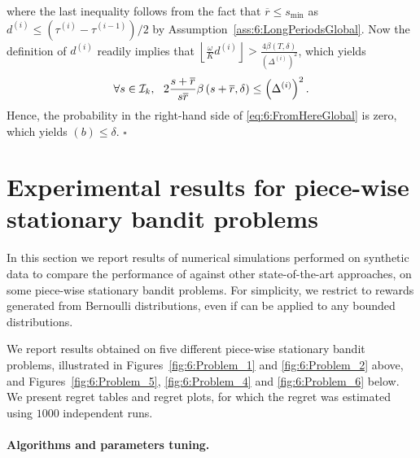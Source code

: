 %
where the last inequality follows from the fact that $\overline{r} \leq s_{\min}$ as $d^{(i)} \leq (\tau^{(i)} - \tau^{(i-1)})/2$ by Assumption~\ref{ass:6:LongPeriodsGlobal}. Now the definition of $d^{(i)}$ readily implies that
$\left\lfloor \frac{\omega}{K}d^{(i)}\right\rfloor > \frac{4\beta(T,\delta)}{\left(\Delta^{(i)}\right)^2}$,
which yields
\[\forall s \in \cI_k, \ \ 2\frac{s+\overline{r}}{s\overline{r}}\beta\left(s+\overline{r}, \delta\right) \leq \left(\Delta^{(i)}\right)^2.\]
%
Hence, the probability in the right-hand side of \eqref{eq:6:FromHereGlobal} is zero, which yields $(b) \leq \delta$.
%
\hfill{}$\square$





\section{Experimental results for piece-wise stationary bandit problems}
\label{sec:6:NumericalExperiments}

In this section we report results of numerical simulations performed on synthetic data to compare the performance of \GLRklUCB{} against other state-of-the-art approaches, on some piece-wise stationary bandit problems.
%
For simplicity, we restrict to rewards generated from Bernoulli distributions, even if \GLRklUCB{} can be applied to any bounded distributions.


We report results obtained on five different piece-wise stationary bandit problems, illustrated in Figures~\ref{fig:6:Problem_1} and \ref{fig:6:Problem_2} above, and Figures~\ref{fig:6:Problem_5}, \ref{fig:6:Problem_4} and \ref{fig:6:Problem_6} below.
We present regret tables and regret plots,
for which the regret was estimated using $1000$ independent runs.


\paragraph{Algorithms and parameters tuning.}
\label{sub:6:ParametersTuning}

